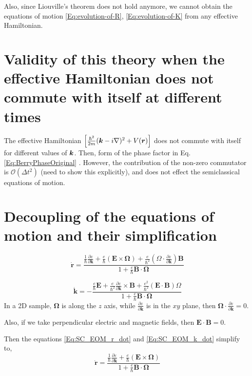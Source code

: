 \documentclass{revtex4-2}
\newcommand{\bvec}[1]{{\mathbf #1}}
\renewcommand\vec[1]{\ensuremath\boldsymbol{#1}} %
\begin{document}
Also, since Liouville's theorem does not hold anymore, we cannot obtain the equations of motion \eqref{Eq:evolution-of-R}, \eqref{Eq:evolution-of-K} from any effective Hamiltonian.
\section{Validity of this theory when the effective Hamiltonian does not commute with itself at different times}
The effective Hamiltonian $\left[\frac{\hbar^2}{2m}(\vec{k} - i \nabla)^2 + V(\vec{r}) \right]$ does not commute with itself for different values of $\vec{k}$. Then, form of the phase factor in Eq. \eqref{Eq:BerryPhaseOriginal} . However, the contribution of the non-zero commutator is $\mathcal{O} \left(\Delta{t}^2\right)$ (need to show this explicitly), and does not effect the semiclassical equations of motion.
\section{Decoupling of the equations of motion and their simplification}
\begin{equation}~\label{Eq:SC_EOM_r_dot}
	\dot{\bvec{r}} = \frac{\frac{1}{\hbar} \frac{\partial \varepsilon}{\partial \bvec{k}} + \frac{e}{\hbar} (\bvec{E}\times\bvec{\Omega}) + \frac{e}{\hbar^2} (\Omega \cdot \frac{\partial \varepsilon}{\partial \bvec{k}} )\bvec{B}}{1 + \frac{e}{\hbar} \bvec{B}\cdot\bvec{\Omega}}
\end{equation}

\begin{equation}~\label{Eq:SC_EOM_k_dot}
	\dot{\bvec{k}} = -\frac{\frac{e}{\hbar} \bvec{E} +\frac{e}{\hbar^2} \frac{\partial \varepsilon}{\partial \bvec{k}} \times \bvec{B} + \frac{e^2}{\hbar^2} (\bvec{E}\cdot\bvec{B})\Omega}{1 + \frac{e}{\hbar} \bvec{B}\cdot\bvec{\Omega}}
\end{equation}
In a 2D sample, $\bvec{\Omega}$ is along the $z$ axis, while $\frac{\partial \varepsilon}{\partial \bvec{k}}$ is in the $xy$ plane, then $\bvec{\Omega} \cdot \frac{\partial \varepsilon}{\partial \bvec{k}} = 0$.

Also, if we take perpendicular electric and magnetic fields, then $\bvec{E}\cdot \bvec{B} = 0$.

Then the equations \eqref{Eq:SC_EOM_r_dot} and \eqref{Eq:SC_EOM_k_dot} simplify to,
\begin{equation}~\label{Eq:SC_EOM_r_dot_decoupled}
	\dot{\bvec{r}} = \frac{\frac{1}{\hbar} \frac{\partial \varepsilon}{\partial \bvec{k}} + \frac{e}{\hbar} (\bvec{E}\times\bvec{\Omega})}{1 + \frac{e}{\hbar} \bvec{B}\cdot\bvec{\Omega}}
\end{equation}
\end{document}
